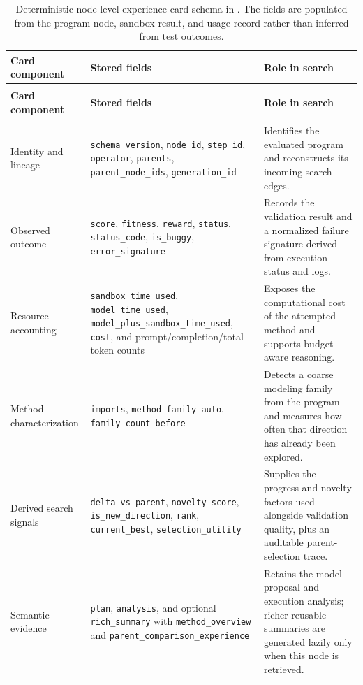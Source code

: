 \begingroup
\small
\setlength{\tabcolsep}{5pt}
\renewcommand{\arraystretch}{1.12}
\setlength{\LTcapwidth}{\textwidth}
\begin{longtable}{@{}>{\raggedright\arraybackslash}p{}>{\raggedright\arraybackslash}p{}>{\raggedright\arraybackslash}p{}@{}}
\caption{Deterministic node-level experience-card schema in \openmleevo{}. The fields are populated from the program node, sandbox result, and usage record rather than inferred from test outcomes.}
\label{tab:openmleevo-experience-card-schema}\\
\toprule
\textbf{Card component} & \textbf{Stored fields} & \textbf{Role in search} \\
\midrule
\endfirsthead
\multicolumn{3}{c}{\tablename\ \thetable\ (continued)}\\
\toprule
\textbf{Card component} & \textbf{Stored fields} & \textbf{Role in search} \\
\midrule
\endhead
\midrule
\multicolumn{3}{r}{Continued on next page}\\
\endfoot
\bottomrule
\endlastfoot
Identity and lineage & \nolinkurl{schema_version}, \nolinkurl{node_id}, \nolinkurl{step_id}, \nolinkurl{operator}, \nolinkurl{parents}, \nolinkurl{parent_node_ids}, \nolinkurl{generation_id} & Identifies the evaluated program and reconstructs its incoming search edges. \\
Observed outcome & \nolinkurl{score}, \nolinkurl{fitness}, \nolinkurl{reward}, \nolinkurl{status}, \nolinkurl{status_code}, \nolinkurl{is_buggy}, \nolinkurl{error_signature} & Records the validation result and a normalized failure signature derived from execution status and logs. \\
Resource accounting & \nolinkurl{sandbox_time_used}, \nolinkurl{model_time_used}, \nolinkurl{model_plus_sandbox_time_used}, \nolinkurl{cost}, and prompt/completion/total token counts & Exposes the computational cost of the attempted method and supports budget-aware reasoning. \\
Method characterization & \nolinkurl{imports}, \nolinkurl{method_family_auto}, \nolinkurl{family_count_before} & Detects a coarse modeling family from the program and measures how often that direction has already been explored. \\
Derived search signals & \nolinkurl{delta_vs_parent}, \nolinkurl{novelty_score}, \nolinkurl{is_new_direction}, \nolinkurl{rank}, \nolinkurl{current_best}, \nolinkurl{selection_utility} & Supplies the progress and novelty factors used alongside validation quality, plus an auditable parent-selection trace. \\
Semantic evidence & \nolinkurl{plan}, \nolinkurl{analysis}, and optional \nolinkurl{rich_summary} with \nolinkurl{method_overview} and \nolinkurl{parent_comparison_experience} & Retains the model proposal and execution analysis; richer reusable summaries are generated lazily only when this node is retrieved. \\
\end{longtable}
\endgroup

